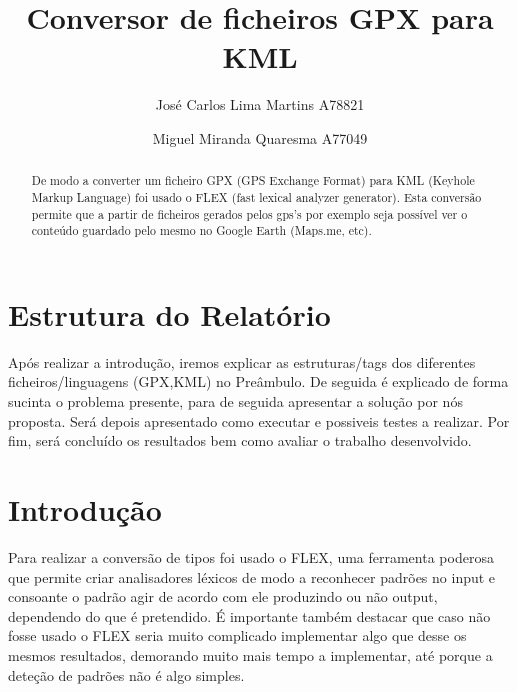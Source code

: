 \documentclass{llncs}
\begin{document}
 \mainmatter
\title{Conversor de ficheiros GPX para KML}
\author{José Carlos Lima Martins A78821 \and
        Miguel Miranda Quaresma A77049}

\maketitle

\justify

\begin{abstract}
De modo a converter um ficheiro GPX (GPS Exchange Format) para KML (Keyhole Markup Language) foi usado o FLEX (fast lexical analyzer generator). Esta conversão permite que a partir de ficheiros gerados pelos gps's por exemplo seja possível ver o conteúdo guardado pelo mesmo no Google Earth (Maps.me, etc).
\end{abstract}

\section{Estrutura do Relatório}
Após realizar a introdução, iremos explicar as estruturas/tags dos diferentes ficheiros/linguagens (GPX,KML) no Preâmbulo. De seguida é explicado de forma sucinta o problema presente, para de seguida apresentar a solução por nós proposta. Será depois apresentado como executar e possiveis testes a realizar. Por fim, será concluído os resultados bem como avaliar o trabalho desenvolvido.

\section{Introdução}
Para realizar a conversão de tipos foi usado o FLEX, uma ferramenta poderosa que permite criar analisadores léxicos de modo a reconhecer padrões no input e consoante o padrão agir de acordo com ele produzindo ou não output, dependendo do que é pretendido. É importante também destacar que caso não fosse usado o FLEX seria muito complicado implementar algo que desse os mesmos resultados, demorando muito mais tempo a implementar, até porque a deteção de padrões não é algo simples.
\end{document}
